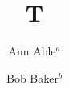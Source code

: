 \documentclass[aps,prd]{revtex4-1}

\title{T}
\author{Ann Able$^{a}$}
\author{Bob Baker$^{b}$}
\begin{abstract}Abs.\end{abstract}
\maketitle
Body.

